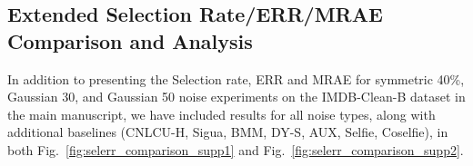 \documentclass{article}
\theoremstyle{plain}
\theoremstyle{definition}
\theoremstyle{remark}
\begin{document}



\subsection{Extended Selection Rate/ERR/MRAE Comparison and Analysis}\label{subsec:ERR}
In addition to presenting the Selection rate, ERR and MRAE
for symmetric 40\%, Gaussian 30, and Gaussian 50 noise experiments on the IMDB-Clean-B dataset in the main manuscript,
we have included results for all noise types, along with additional baselines (CNLCU-H, Sigua, BMM, DY-S, AUX, Selfie, Coselfie),
in both Fig.~\ref{fig:selerr_comparison_supp1} and Fig.~\ref{fig:selerr_comparison_supp2}.
\end{document}
